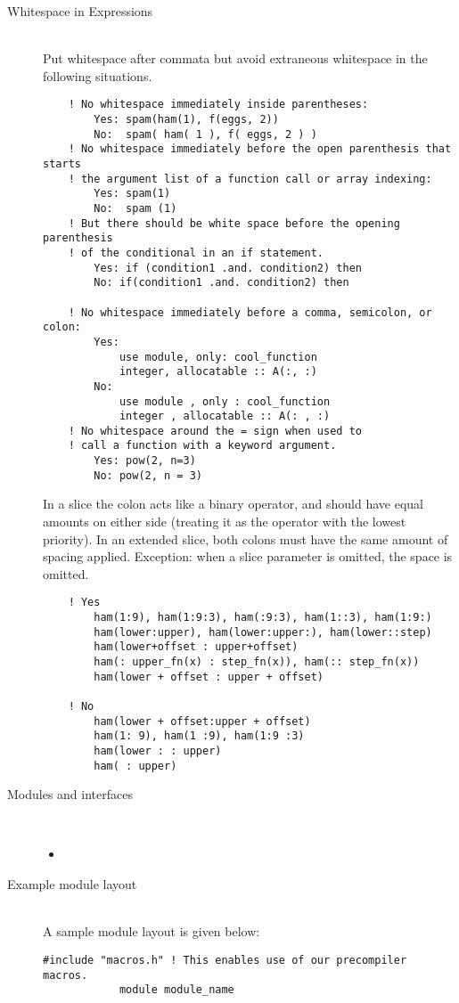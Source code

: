 \documentclass[a4paper,notitlepage]{scrreprt}
\newcommand\headitem[1]{\needspace{1.5\baselineskip}\item[{\boldmath #1 \nopagebreak}] \hfill \\ \nopagebreak}
\begin{document}
\begin{description}
    \headitem{Whitespace in Expressions}
        Put whitespace after commata but
        avoid extraneous whitespace in the following situations.

        \begin{lstlisting}
    ! No whitespace immediately inside parentheses:
        Yes: spam(ham(1), f(eggs, 2))
        No:  spam( ham( 1 ), f( eggs, 2 ) )
    ! No whitespace immediately before the open parenthesis that starts
    ! the argument list of a function call or array indexing:
        Yes: spam(1)
        No:  spam (1)
    ! But there should be white space before the opening parenthesis
    ! of the conditional in an if statement.
        Yes: if (condition1 .and. condition2) then
        No: if(condition1 .and. condition2) then

    ! No whitespace immediately before a comma, semicolon, or colon:
        Yes:
            use module, only: cool_function
            integer, allocatable :: A(:, :)
        No:
            use module , only : cool_function
            integer , allocatable :: A(: , :)
    ! No whitespace around the = sign when used to
    ! call a function with a keyword argument.
        Yes: pow(2, n=3)
        No: pow(2, n = 3)
        \end{lstlisting}
        In a slice the colon acts like a binary operator,
        and should have equal amounts on either side
        (treating it as the operator with the lowest priority).
        In an extended slice, both colons must have the same amount
        of spacing applied.
        Exception: when a slice parameter is omitted, the space is omitted.
        \begin{lstlisting}
    ! Yes
        ham(1:9), ham(1:9:3), ham(:9:3), ham(1::3), ham(1:9:)
        ham(lower:upper), ham(lower:upper:), ham(lower::step)
        ham(lower+offset : upper+offset)
        ham(: upper_fn(x) : step_fn(x)), ham(:: step_fn(x))
        ham(lower + offset : upper + offset)

    ! No
        ham(lower + offset:upper + offset)
        ham(1: 9), ham(1 :9), ham(1:9 :3)
        ham(lower : : upper)
        ham( : upper)
        \end{lstlisting}

	\headitem{Modules and interfaces}
		\begin{itemize}
			\item
		\end{itemize}

	\headitem{Example module layout}
		A sample module layout is given below:
		\begin{lstlisting}[gobble=12]
            #include "macros.h" ! This enables use of our precompiler macros.
            module module_name


\end{lstlisting}
\end{description}
\end{document}

